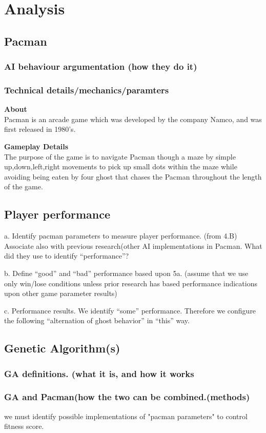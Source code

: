 \section{Analysis} \label{sec:analysis}




\subsection{Pacman}
\subsubsection{AI behaviour argumentation (how they do it)}
\subsubsection{Technical details/mechanics/paramters}

\textbf{About}\\
Pacman is an arcade game which was developed by the company Namco, and was first released in 1980's.

\textbf{Gameplay Details}\\
The purpose of the game is to navigate Pacman though a maze by simple up,down,left,right movements to pick up small dots within the maze while avoiding being eaten by four ghost that chases the Pacman throughout the length of the game.










\subsection{Player performance}
a. Identify pacman parameters to measure player performance. (from 4.B) Associate also with  previous research(other AI implementations in Pacman. What did they use to  identify “performance”?


b. Define “good” and “bad” performance based upon 5a. (assume that we use only win/lose conditions unless prior research has based performance indications upon other game parameter results)

c. Performance results. We identify “some” performance. Therefore we configure the following “alternation of ghost behavior” in “this” way.

\subsection{Genetic Algorithm(s)}

\subsubsection{GA definitions. (what it is, and how it works}
\subsubsection{GA and Pacman(how the two can be combined.(methods)}
we must identify possible implementations of "pacman parameters" to control fitness score.
